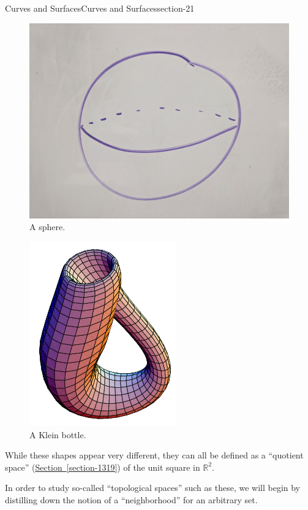 \documentclass[oneside,10pt,]{article}
\begin{document}
\begin{sectionptx}{Curves and Surfaces}{}{Curves and Surfaces}{}{}{section-21}
\begin{figure}
\includegraphics[width=1\linewidth]{images/sphere.jpg}
\caption{A sphere.\label{figure-107}}
\end{figure}
\begin{figure}
\centering
\includegraphics[width=1\linewidth]{images/klein-bottle.png}
\caption{A Klein bottle.\label{figure-110}}
\end{figure}
\hypertarget{p-113}{}%
While these shapes appear very different, they can all be defined as a ``quotient space'' (\hyperref[section-1319]{Section~\ref{section-1319}}) of the unit square in \(\mathbb R^2\).%
\par
\hypertarget{p-117}{}%
In order to study so-called ``topological spaces'' such as these, we will begin by distilling down the notion of a ``neighborhood'' for an arbitrary set.%
\end{sectionptx}
\end{document}
